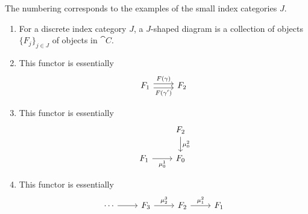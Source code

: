\documentclass[12pt]{article}
\begin{document}
\begin{example}
	The numbering corresponds to the examples of the small index categories $J$.
	\begin{enumerate}
		\item For a discrete index category $J$, a $J$-shaped diagram is a collection of objects $\{F_j\}_{j\in J}$ of objects in $\cat{C}$.

		\item This functor is essentially
			\begin{equation*}
\begin{tikzcd}
F_1 \arrow[r, "F(\gamma)", shift left] \arrow[r, "F(\gamma')"', shift right] & F_2
\end{tikzcd}
			\end{equation*}

		\item This functor is essentially 
			\begin{equation*}
\begin{tikzcd}
                          & F_2 \arrow[d, "\mu^2_0"] \\
F_1 \arrow[r, "\mu_0^1"'] & F_0                     
\end{tikzcd}
			\end{equation*}

		\item This functor is essentially 
			\begin{equation*}
\begin{tikzcd}
\cdots \arrow[r] & F_3 \arrow[r, "\mu^3_2"] & F_2 \arrow[r, "\mu^2_1"] & F_1
\end{tikzcd}
			\end{equation*}
	\end{enumerate}
\end{example}
\end{document}
